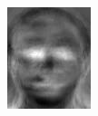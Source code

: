 \begin{frame}
\begin{columns}
\begin{overlayarea}{\textwidth}{\textheight}
{        \begin{minipage}[t]{0.15\textwidth}
          \includegraphics[width=\textwidth]{images/eig_docked_image/eig_9.jpeg}
        \end{minipage}
        \begin{minipage}[t]{0.15\textwidth}

\end{minipage}}
\end{overlayarea}
\end{columns}
\end{frame}

